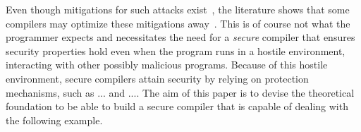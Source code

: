 \documentclass[utf8,acmsmall,review,screen,dvipsnames]{acmart}
\begin{document}
Even though mitigations for such attacks exist~\cite{bond2017vale,almeida2017jasmin}, the literature shows that some compilers may optimize these mitigations away~\cite{barthe2018sec}.
This is of course not what the programmer expects and necessitates the need for a {\em secure} compiler that ensures security properties hold even when the program runs in a hostile environment, interacting with other possibly malicious programs.
Because of this hostile environment, secure compilers attain security by relying on protection mechanisms, such as ... and ....
The aim of this paper is to devise the theoretical foundation to be able to build a secure compiler that is capable of dealing with the following example.
\end{document}
